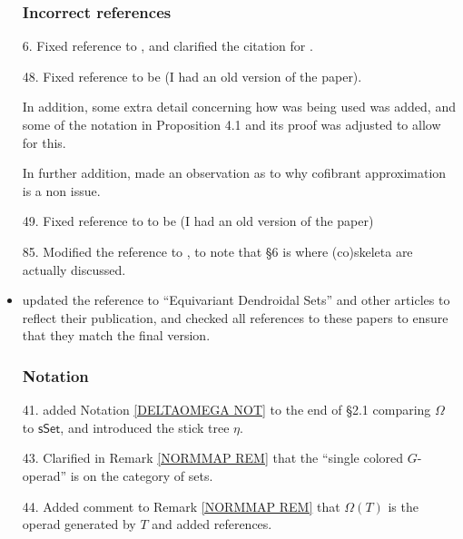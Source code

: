 \documentclass{article}
\begin{document}
\begin{itemize}
      \subsubsection*{Incorrect references}
      
\item[6.] Fixed reference \cite[Prop. 3.21]{BP17} to \cite[Prop. 3.23]{BP17}, and clarified the citation for \cite{BP17}.

\item[48.] Fixed reference \cite[Prop. 3.4.18]{Hir03} to be \cite[Thm. 3.3.18]{Hir03} (I had an old version of the paper).
      
      In addition, some extra detail concerning how \cite[Prop. 3.3.18]{Hir03} was being used was added, and some of the notation in Proposition 4.1 and its proof was adjusted to allow for this.
      
      In further addition, made an observation as to why cofibrant approximation is a non issue.
      
\item[49.] Fixed reference to \cite[Thm. 3.3.8]{Hir03} to be \cite[Thm. 3.2.13]{Hir03} (I had an old version of the paper)
      
\item[85.] Modified the reference \cite[\S 4]{BM11} to \cite[\S 4,\S 6]{BM11}, to note that \S 6 is where (co)skeleta are actually discussed.
      
\item updated the reference to ``Equivariant Dendroidal Sets'' and other articles to reflect their publication,
      and checked all references to these papers to ensure that they match the final version. %




      \subsubsection*{Notation}
\item[41.] added Notation \ref{DELTAOMEGA NOT} to the end of \S 2.1 comparing $\Omega$ to $\mathsf{sSet}$, and introduced the stick tree $\eta$. %

      
\item[43.] Clarified in Remark \ref{NORMMAP REM} that the ``single colored $G$-operad'' is on the category of sets. %

      
\item[44.] Added comment to Remark \ref{NORMMAP REM} that $\Omega(T)$ is the operad generated by $T$ and added references. %


\end{itemize}
\end{document}
